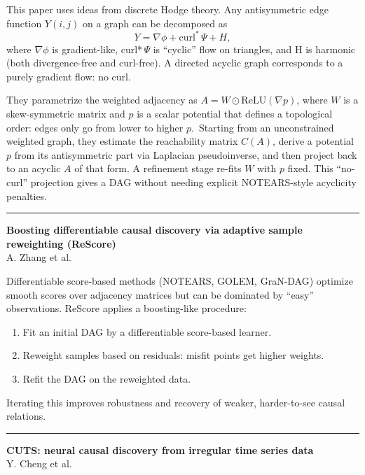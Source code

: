 \documentclass[a5paper]{article}
\providecommand{\tightlist}{%
  \setlength{\itemsep}{0pt}\setlength{\parskip}{0pt}}
\begin{document}
This paper uses ideas from discrete Hodge theory. Any antisymmetric edge
function $Y(i,j)$ on a graph can be decomposed as
\[ Y = \nabla \phi + \mathrm{curl}^\ast\, \Psi + H, \]
where $\nabla \phi$ is gradient-like, curl*$\,\Psi$ is ``cyclic'' flow on triangles, and H
is harmonic (both divergence-free and curl-free). A directed acyclic
graph corresponds to a purely gradient flow: no curl.

They parametrize the weighted adjacency as $A = W\odot\mathrm{ReLU}(\nabla p)$, where $W$ is a
skew-symmetric matrix and $p$ is a scalar potential that defines a
topological order: edges only go from lower to higher $p$.~Starting from
an unconstrained weighted graph, they estimate the reachability matrix
$C(A)$, derive a potential $p$ from its antisymmetric part via Laplacian
pseudoinverse, and then project back to an acyclic $A$ of that form. A
refinement stage re-fits $W$ with $p$ fixed. This ``no-curl'' projection
gives a DAG without needing explicit NOTEARS-style acyclicity penalties.

\begin{center}\rule{0.5\linewidth}{0.5pt}\end{center}

\textbf{Boosting differentiable causal discovery via adaptive sample
reweighting (ReScore)}\\
A. Zhang et al.

Differentiable score-based methods (NOTEARS, GOLEM, GraN-DAG) optimize
smooth scores over adjacency matrices but can be dominated by ``easy''
observations. ReScore applies a boosting-like procedure:

\begin{enumerate}
\def\labelenumi{\arabic{enumi}.}
\tightlist
\item
  Fit an initial DAG by a differentiable score-based learner.
\item
  Reweight samples based on residuals: misfit points get higher
  weights.
\item
  Refit the DAG on the reweighted data.
\end{enumerate}

Iterating this improves robustness and recovery of weaker, harder-to-see
causal relations.

\begin{center}\rule{0.5\linewidth}{0.5pt}\end{center}

\textbf{CUTS: neural causal discovery from irregular time series data}\\
Y. Cheng et al.
\end{document}
